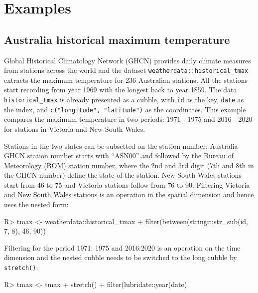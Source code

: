 \documentclass[
]{jss}
\begin{document}
\newpage

\hypertarget{examples}{%
\section{Examples}\label{examples}}

\hypertarget{australia-historical-maximum-temperature}{%
\subsection{Australia historical maximum
temperature}\label{australia-historical-maximum-temperature}}

Global Historical Climatology Network (GHCN) provides daily climate
measures from stations across the world and the dataset
\texttt{weatherdata::historical\_tmax} extracts the maximum temperature
for 236 Australian stations. All the stations start recording from year
1969 with the longest back to year 1859. The data
\texttt{historical\_tmax} is already presented as a cubble, with
\texttt{id} as the key, \texttt{date} as the index, and
\texttt{c("longitude",\ "latitude")} as the coordinates. This example
compares the maximum temperature in two periods: 1971 - 1975 and 2016 -
2020 for stations in Victoria and New South Wales.

Stations in the two states can be subsetted on the station number:
Australia GHCN station number starts with ``ASN00'' and followed by the
\href{http://www.bom.gov.au/climate/cdo/about/site-num.shtml}{Bureau of
Meteorology (BOM) station number}, where the 2nd and 3rd digit (7th and
8th in the GHCN number) define the state of the station. New South Wales
stations start from 46 to 75 and Victoria stations follow from 76 to 90.
Filtering Victoria and New South Wales stations is an operation in the
spatial dimension and hence uses the nested form:

\begin{CodeChunk}
\begin{CodeInput}
R> tmax <- weatherdata::historical_tmax %
+   filter(between(stringr::str_sub(id, 7, 8), 46, 90))
\end{CodeInput}
\end{CodeChunk}

Filtering for the period 1971: 1975 and 2016:2020 is an operation on the
time dimension and the nested cubble needs to be switched to the long
cubble by \texttt{stretch()}:

\begin{CodeChunk}
\begin{CodeInput}
R> tmax <- tmax %
+   stretch() %
+   filter(lubridate::year(date) %
\end{CodeInput}
\end{CodeChunk}
\end{document}
